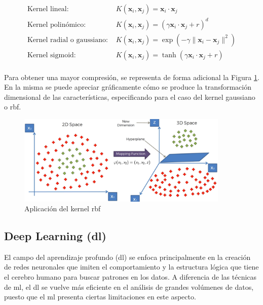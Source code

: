 \[\begin{array}{ll}
    \text{Kernel lineal: } & K(\mathbf{x}_i, \mathbf{x}_j) = \mathbf{x}_i \cdot \mathbf{x}_j\\
    \text{Kernel polinómico: } & K(\mathbf{x}_i, \mathbf{x}_j) = (\gamma \mathbf{x}_i \cdot \mathbf{x}_j + r)^d\\
    \text{Kernel radial o gaussiano: } & K(\mathbf{x}_i, \mathbf{x}_j) = \exp \left( -\gamma \| \mathbf{x}_i - \mathbf{x}_j \|^2 \right)\\
    \text{Kernel sigmoid: } & K(\mathbf{x}_i, \mathbf{x}_j) = \tanh(\gamma \mathbf{x}_i \cdot \mathbf{x}_j + r)\\
\end{array}\]

\vspace{3mm}

Para obtener una mayor compresión, se representa de forma adicional la Figura \ref{fig:rbf}. En la misma se puede apreciar gráficamente cómo se produce la transformación dimensional de las características, especificando para el caso del kernel gaussiano o \gls{rbf}.

\vspace{3mm}

\begin{figure}[H]
    \centering
    \includegraphics[width=0.9\textwidth]{img/teoria/rbf.png}
    \caption{Aplicación del kernel \acrshort{rbf} \cite{rbf}}
    \label{fig:rbf}
\end{figure}

\subsection{Deep Learning (\acrshort{dl})}
\label{sec:dl}

El campo del aprendizaje profundo (\acrfull{dl}) se enfoca principalmente en la creación de redes neuronales que imiten el comportamiento y la estructura lógica que tiene el cerebro humano para buscar patrones en los datos. A diferencia de las técnicas de \gls{ml}, el \gls{dl} se vuelve más eficiente en el análisis de grandes volúmenes de datos, puesto que el \gls{ml} presenta ciertas limitaciones en este aspecto. \cite{metal} 

